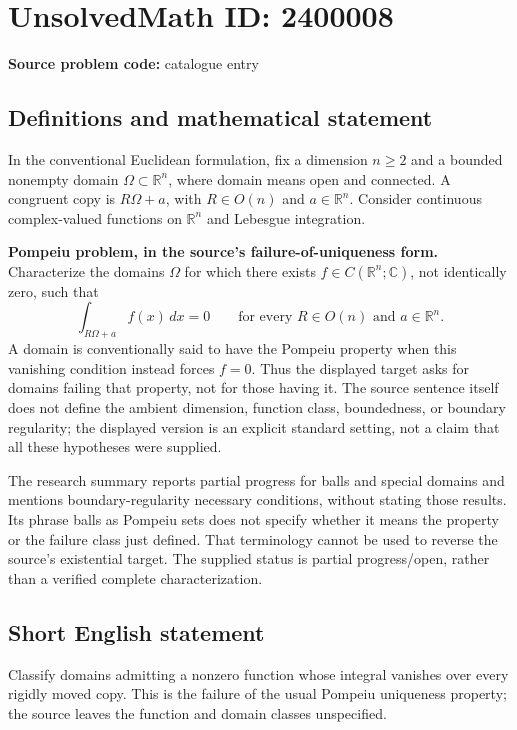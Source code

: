 \documentclass[11pt]{article}
\begin{document}
\section*{UnsolvedMath ID: 2400008}
\textbf{Source problem code:} catalogue entry
\subsection{Definitions and mathematical statement}
In the conventional Euclidean formulation, fix a dimension $n\geq2$ and a bounded nonempty domain $\Omega\subset\mathbb R^n$, where domain means open and connected. A congruent copy is $R\Omega+a$, with $R\in O(n)$ and $a\in\mathbb R^n$. Consider continuous complex-valued functions on $\mathbb R^n$ and Lebesgue integration.

\textbf{Pompeiu problem, in the source's failure-of-uniqueness form.} Characterize the domains $\Omega$ for which there exists $f\in C(\mathbb R^n;\mathbb C)$, not identically zero, such that
\[
\int_{R\Omega+a}f(x)\,dx=0
\qquad\text{for every }R\in O(n)\text{ and }a\in\mathbb R^n.
\]
A domain is conventionally said to have the Pompeiu property when this vanishing condition instead forces $f=0$. Thus the displayed target asks for domains failing that property, not for those having it. The source sentence itself does not define the ambient dimension, function class, boundedness, or boundary regularity; the displayed version is an explicit standard setting, not a claim that all these hypotheses were supplied.

The research summary reports partial progress for balls and special domains and mentions boundary-regularity necessary conditions, without stating those results. Its phrase balls as Pompeiu sets does not specify whether it means the property or the failure class just defined. That terminology cannot be used to reverse the source's existential target. The supplied status is partial progress/open, rather than a verified complete characterization.
\subsection{Short English statement}
Classify domains admitting a nonzero function whose integral vanishes over every rigidly moved copy. This is the failure of the usual Pompeiu uniqueness property; the source leaves the function and domain classes unspecified.
\end{document}
